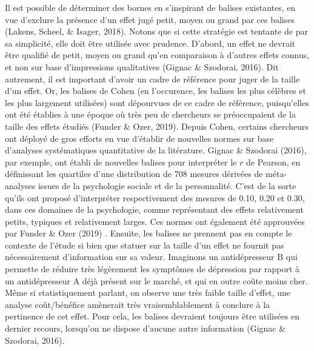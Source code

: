 \documentclass[
  12pt,
  french,
]{article}
\begin{document}
Il est possible de déterminer des bornes en s'inspirant de balises
existantes, en vue d'exclure la présence d'un effet jugé petit, moyen ou
grand par ces balises (Lakens, Scheel, \& Isager, 2018). Notons que si
cette stratégie est tentante de par sa simplicité, elle doit être
utilisée avec prudence. D'abord, un effet ne devrait être qualifié de
petit, moyen ou grand qu'en comparaison à d'autres effets connus, et non
sur base d'impressions qualitatives (Gignac \& Szodorai, 2016). Dit
autrement, il est important d'avoir un cadre de référence pour juger de
la taille d'un effet. Or, les balises de Cohen (en l'occurence, les
balises les plus célèbres et les plus largement utilisées) sont
dépourvues de ce cadre de référence, puisqu'elles ont été établies à une
époque où très peu de chercheurs se préoccupaient de la taille des
effets étudiés (Funder \& Ozer, 2019). Depuis Cohen, certains chercheurs
ont déployé de gros efforts en vue d'établir de nouvelles normes sur
base d'analyses systématiques quantitative de la litérature. Gignac \&
Szodorai (2016), par exemple, ont établi de nouvelles balises pour
interpréter le \(r\) de Pearson, en définissant les quartiles d'une
distribution de 708 mesures dérivées de méta-analyses issues de la
psychologie sociale et de la personnalité. C'est de la sorte qu'ils ont
proposé d'interpréter respectivement des mesures de 0.10, 0.20 et 0.30,
dans ces domaines de la psychologie, comme représentant des effets
relativement petits, typiques et relativement larges. Ces normes ont
également été approuvées par Funder \& Ozer (2019)
.
Ensuite, les balises ne prennent pas en compte le contexte de l'étude si
bien que statuer sur la taille d'un effet ne fournit pas nécessairement
d'information sur sa valeur. Imaginons un antidépresseur B qui permette
de réduire très légèrement les symptômes de dépression par rapport à un
antidépresseur A déjà présent sur le marché, et qui en outre coûte moins
cher. Même si statistiquement parlant, on observe une très faible taille
d'effet, une analyse coût/bénéfice amènerait très vraisemblablement à
conclure à la pertinence de cet effet. Pour cela, les balises devraient
toujours être utilisées en dernier recours, lorsqu'on ne dispose
d'aucune autre information (Gignac \& Szodorai, 2016).
\end{document}
